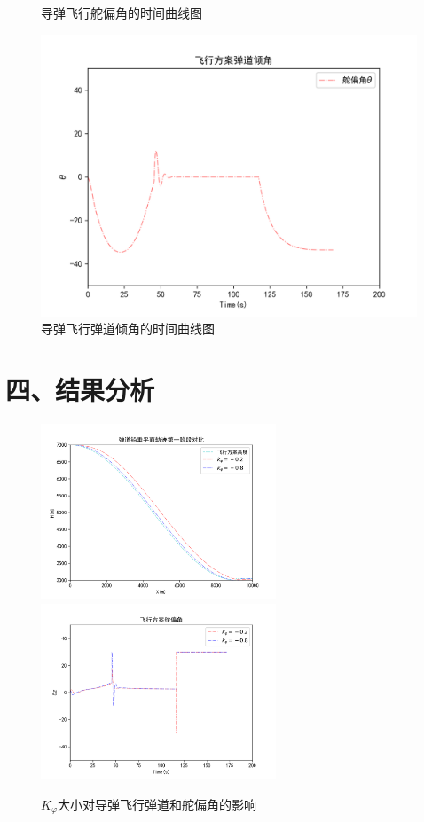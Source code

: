 \documentclass[UTF8]{ctexart}
\begin{document}
\begin{itemize}
\begin{figure}[H]
    \caption{导弹飞行舵偏角的时间曲线图}
\end{figure}
\begin{figure}[H]
    \centering
    \includegraphics[width=130mm]{img/飞行弹道倾角.png}
    \caption{导弹飞行弹道倾角的时间曲线图}
\end{figure}

\section*{ 四、结果分析}

\begin{figure}[H]
    \centering
    \includegraphics[width=70mm]{img/飞行轨迹2.png}
    \includegraphics[width=70mm]{img/飞行舵偏角2.png}
    \caption{$K_{\varphi}$大小对导弹飞行弹道和舵偏角的影响}\label{fig:k1}
\end{figure}


\end{itemize}
\end{document}
